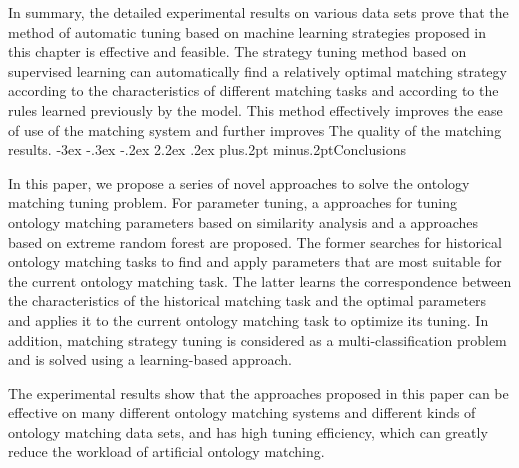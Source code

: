 \documentclass[twoside]{article}
\makeatletter
\def\section{\@startsection{section}{1}{\z@}%
 {-3ex \@plus -.3ex \@minus -.2ex}%
 {2.2ex \@plus.2ex}%
{\normalfont\normalsize\protect\baselineskip=14.5pt plus.2pt minus.2pt\bfseries}}
\makeatother
\begin{document}
In summary, the detailed experimental results on various data sets prove that the method of automatic tuning based on machine learning strategies proposed in this chapter is effective and feasible.
The strategy tuning method based on supervised learning can automatically find a relatively optimal matching strategy according to the characteristics of different matching tasks and according to the rules learned previously by the model.
This method effectively improves the ease of use of the matching system and further improves The quality of the matching results.
\section{Conclusions}

In this paper, we propose a series of novel approaches to solve the ontology matching tuning problem.
For parameter tuning, a approaches for tuning ontology matching parameters based on similarity analysis and a approaches based on extreme random forest are proposed.
The former searches for historical ontology matching tasks to find and apply parameters that are most suitable for the current ontology matching task.
The latter learns the correspondence between the characteristics of the historical matching task and the optimal parameters and applies it to the current ontology matching task to optimize its tuning.
In addition, matching strategy tuning is considered as a multi-classification problem and is solved using a learning-based approach.

The experimental results show that the approaches proposed in this paper can be effective on many different ontology matching systems and different kinds of ontology matching data sets, and has high tuning efficiency, which can greatly reduce the workload of artificial ontology matching.

\vspace{2mm}
\end{document}
